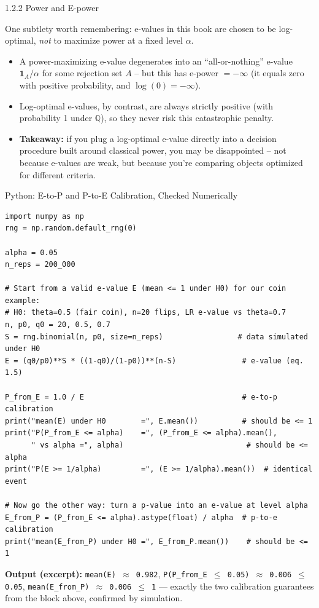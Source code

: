 \documentclass[aspectratio=169,10pt]{beamer}
\begin{document}
\begin{frame}[allowframebreaks]{1.2.2 Power and E-power}
\framebreak

One subtlety worth remembering: e-values in this book are chosen to be
log-optimal, \emph{not} to maximize power at a fixed level $\alpha$.
\begin{itemize}
  \item A power-maximizing e-value degenerates into an ``all-or-nothing''
    e-value $\mathbf{1}_A/\alpha$ for some rejection set $A$ -- but this
    has e-power $=-\infty$ (it equals zero with positive probability, and
    $\log(0)=-\infty$).
  \item Log-optimal e-values, by contrast, are always strictly positive
    (with probability 1 under $\mathbb{Q}$), so they never risk this
    catastrophic penalty.
\end{itemize}

\framebreak

\begin{itemize}
  \item \textbf{Takeaway:} if you plug a log-optimal e-value directly into
    a decision procedure built around classical power, you may be
    disappointed -- not because e-values are weak, but because you're
    comparing objects optimized for different criteria.
\end{itemize}

\end{frame}

\begin{frame}[fragile]{Python: E-to-P and P-to-E Calibration, Checked Numerically}

\begin{lstlisting}
import numpy as np
rng = np.random.default_rng(0)

alpha = 0.05
n_reps = 200_000

# Start from a valid e-value E (mean <= 1 under H0) for our coin example:
# H0: theta=0.5 (fair coin), n=20 flips, LR e-value vs theta=0.7
n, p0, q0 = 20, 0.5, 0.7
S = rng.binomial(n, p0, size=n_reps)                 # data simulated under H0
E = (q0/p0)**S * ((1-q0)/(1-p0))**(n-S)               # e-value (eq. 1.5)

P_from_E = 1.0 / E                                    # e-to-p calibration
print("mean(E) under H0        =", E.mean())          # should be <= 1
print("P(P_from_E <= alpha)    =", (P_from_E <= alpha).mean(),
      " vs alpha =", alpha)                            # should be <= alpha
print("P(E >= 1/alpha)         =", (E >= 1/alpha).mean())  # identical event

# Now go the other way: turn a p-value into an e-value at level alpha
E_from_P = (P_from_E <= alpha).astype(float) / alpha  # p-to-e calibration
print("mean(E_from_P) under H0 =", E_from_P.mean())    # should be <= 1
\end{lstlisting}

\medskip
\textbf{Output (excerpt):} \texttt{mean(E) $\approx$ 0.982},
\texttt{P(P\_from\_E $\le$ 0.05) $\approx$ 0.006 $\le$ 0.05},
\texttt{mean(E\_from\_P) $\approx$ 0.006 $\le$ 1} --- exactly the two
calibration guarantees from the block above, confirmed by simulation.

\end{frame}
\end{document}

